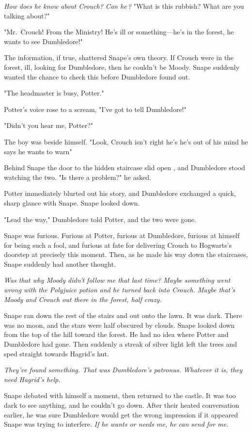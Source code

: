 \emph{How does he know about Crouch? Can he{\el}\,?} "What is this rubbish? What are you talking about?"

"Mr.~Crouch! From the Ministry! He's ill or something—he's in the forest, he wants to see Dumbledore!"

The information, if true, shattered Snape's own theory. If Crouch were in the forest, ill, looking for Dumbledore, then he couldn't be Moody. Snape suddenly wanted the chance to check this before Dumbledore found out.

"The headmaster is busy, Potter."

Potter's voice rose to a scream, "I've got to tell Dumbledore!"

"Didn't you hear me, Potter?"

The boy was beside himself. "Look, Crouch isn't right{\el} he's{\el} he's out of his mind{\el} he says he wants to warn{\el}"

Behind Snape the door to the hidden staircase slid open , and Dumbledore stood watching the two. "Is there a problem?" he asked.

Potter immediately blurted out his story, and Dumbledore exchanged a quick, sharp glance with Snape. Snape looked down.

"Lead the way," Dumbledore told Potter, and the two were gone.

Snape was furious. Furious at Potter, furious at Dumbledore, furious at himself for being such a fool, and furious at fate for delivering Crouch to Hogwarts's doorstep at precisely this moment. Then, as he made his way down the staircases, Snape suddenly had another thought.

\emph{Was that why Moody didn't follow me that last time? Maybe something went wrong with the Polyjuice potion and he turned back into Crouch. Maybe that's Moody and Crouch out there in the forest, half crazy.}

Snape ran down the rest of the stairs and out onto the lawn. It was dark. There was no moon, and the stars were half obscured by clouds. Snape looked down from the top of the hill toward the forest. He had no idea where Potter and Dumbledore had gone. Then suddenly a streak of silver light left the trees and sped straight towards Hagrid's hut.

\emph{They've found something. That was Dumbledore's patronus. Whatever it is, they need Hagrid's help.}

Snape debated with himself a moment, then returned to the castle. It was too dark to see anything, and he couldn't go down. After their heated conversation earlier, he was sure Dumbledore would get the wrong impression if it appeared Snape was trying to interfere. \emph{If he wants or needs me, he can send for me.}

